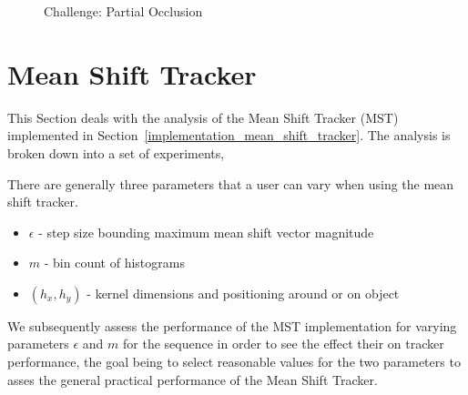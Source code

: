 \begin{figure}     
    \caption{Challenge: Partial Occlusion\label{fig:ch_partial_occlusion}
 }
\end{figure}


\section{Mean Shift Tracker}
This Section deals with the analysis of the Mean Shift Tracker (MST)
implemented in Section~\ref{implementation_mean_shift_tracker}. The analysis is
broken down into a set of experiments,

There are generally three parameters that a user can vary when using the mean
shift tracker. 
\begin{itemize}
    \item $\epsilon$ - step size bounding maximum mean shift vector magnitude
    \item $m$ - bin count of histograms
    \item $(h_x,h_y)$ - kernel dimensions and positioning around or on object
\end{itemize}
We subsequently assess the performance of the MST implementation
for varying parameters $\epsilon$ and $m$ for the sequence in order to see the
effect their on tracker performance, the goal being to select reasonable values
for the two parameters to asses the general practical performance of the Mean
Shift Tracker. 

